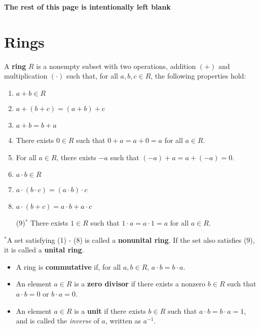 \documentclass [12pt] {article}
\newenvironment{definition}[1]{\begin{tcolorbox}[title={Definition: #1},colback=blue!5!white,colframe=black!75!blue]}{\end{tcolorbox}}
\renewcommand{\it}[1]{\textit{{#1}}}
\renewcommand{\bf}[1]{\textbf{{#1}}}
\begin{document}
\begin{center}
    \vspace{5em}
    \bf{The rest of this page is intentionally left blank}
\end{center}

\newpage
\section{Rings}
\begin{definition}{Ring}
    A \bf{ring} $R$ is a nonempty subset with two operations, addition $(+)$ and multiplication
    $(\cdot)$ such that, for all $a, b, c \in R$, the following properties hold:
    \begin{enumerate}[label=(\arabic*)]
        \item $a + b \in R$
        \item $a + (b + c) = (a + b) + c$
        \item $a + b = b + a$
        \item There exists $0 \in R$ such that $0 + a = a + 0 = a$ for all $a \in R$.
        \item For all $a \in R$, there exists $-a$ such that $(-a) + a = a + (-a) = 0$.
        \item $a \cdot b \in R$
        \item $a \cdot (b \cdot c) = (a \cdot b) \cdot c$
        \item $a \cdot (b + c) = a \cdot b + a \cdot c$
        \item[(9)$^*$] There exists $1 \in R$ such that $1 \cdot a = a \cdot 1 = a$ for all $a \in R$.
    \end{enumerate}
    $^*$A set satisfying (1) - (8) is called a \bf{nonunital ring}. If the set also satisfies (9),
    it is called a \bf{unital ring}.

    \vspace{-0.5em}
    \begin{itemize}[label=$\to$, leftmargin=*, itemsep=0em]
        \item A ring is \bf{commutative} if, for all $a, b \in R$, $a \cdot b = b \cdot a$.
        \item An element $a \in R$ is a \bf{zero divisor} if there exists a nonzero $b \in R$ such
            that $a \cdot b = 0$ or $b \cdot a = 0$.
        \item An element $a \in R$ is a \bf{unit} if there exists $b \in R$ such that
            $a \cdot b = b \cdot a = 1$, and is called the \it{inverse} of $a$, written as $a^{-1}$.
    \end{itemize}
\end{definition}
\end{document}
